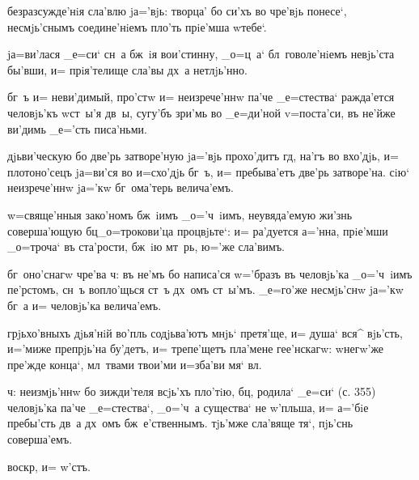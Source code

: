 без\ъ разсужде'нiя сла'влю jа='вjь: творца' бо си'хъ во 
чре'вjь понесе`, несмjь'снымъ соедине'нiемъ пло'ть 
прiе'мша w\т тебе`.

jа=ви'лася _е=си` сн~а бж~iя вои'стинну, _о=ц~а` 
бл~говоле'нiемъ невjь'ста бы'вши, и= прiя'телище сла'вы 
дх~а нетлjь'нно.

бг~ъ и= неви'димый, про'стw и= неизрече'ннw па'че 
_е=стества` ражда'ется человjь'къ w\т ст~ы'я дв~ы, 
сугу'бъ зри'мь во _е=ди'ной v=поста'си, въ не'йже ви'димь 
_е='сть писа'ньми.


дjьви'ческую бо две'рь затворе'ную jа='вjь прохо'дитъ 
гд, на'гъ во вхо'дjь, и= плотоно'сецъ jа=ви'ся во 
и=схо'дjь бг~ъ, и= пребыва'етъ две'рь затворе'на. сiю` 
неизрече'ннw jа='кw бг~ома'терь велича'емъ.

w=свяще'нныя зако'номъ бж~iимъ _о='ч~iимъ, неувяда'емую 
жи'знь соверша'ющую бц _о=трокови'ца процвjьте`: и= 
ра'дуется а='нна, прiе'мши _о=троча` въ ста'рости, бж~iю 
мт~рь, ю='же сла'вимъ.

бг~оно'снагw чре'ва ч: въ не'мъ бо написа'ся 
w='бразъ въ человjь'ка _о='ч~iимъ пе'рстомъ, сн~ъ 
вопло'щься ст~ъ дх~омъ ст~ы'мъ. _е=го'же несмjь'снw 
jа='кw бг~а и= человjь'ка велича'емъ.

грjьхо'вныхъ дjья'нiй во'пль содjьва'ютъ мнjь` претя'ще, 
и= душа` вся^ вjь'сть, и='миже препрjь'на бу'детъ, и= 
трепе'щетъ пла'мене гее'нскагw: w\т негw'же пре'жде 
конца`, мл~твами твои'ми и=зба'ви мя` вл.

ч: неизмjь'ннw бо зижди'теля всjь'хъ пло'тiю, бц, 
родила` _е=си` (с. 355) человjь'ка па'че _е=стества`, 
_о='ч~а существа` не w'пльша, и= а='бiе пребы'сть 
дв~а дх~омъ бж~е'ственнымъ. тjь'мже сла'вяще тя`, пjь'снь 
соверша'емъ.

воскр, и= w'стъ.%